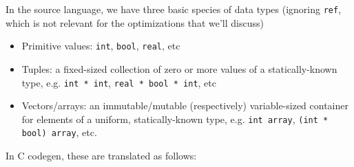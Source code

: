 \documentclass[leqno,11pt]{article}
\begin{document}
In the source language, we have three basic species of data types (ignoring
\texttt{ref}, which is not relevant for the optimizations that we'll discuss)
\begin{itemize}
\item Primitive values: \texttt{int}, \texttt{bool}, \texttt{real}, etc
\item Tuples: a fixed-sized collection of zero or more values of a
  statically-known type, e.g. \texttt{int * int}, \texttt{real * bool * int},
  etc
\item Vectors/arrays: an immutable/mutable (respectively) variable-sized
  container for elements of a uniform, statically-known type, e.g. \texttt{int
    array}, \texttt{(int * bool) array}, etc.
\end{itemize}
In C codegen, these are translated as follows:
\end{document}
